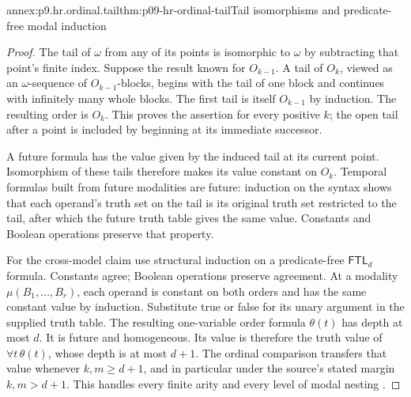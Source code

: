 \begin{annexitem}{annex:p9.hr.ordinal.tail}{thm:p09-hr-ordinal-tail}{Tail isomorphisms and predicate-free modal induction}
\begin{proof}
The tail of \(\omega\) from any of its points is
isomorphic to \(\omega\) by subtracting that
point's finite index. Suppose the result known
for \(O_{k-1}\). A tail of \(O_k\), viewed as
an \(\omega\)-sequence of \(O_{k-1}\)-blocks,
begins with the tail of one block and continues
with infinitely many whole blocks. The first
tail is itself \(O_{k-1}\) by induction.
The resulting order is \(O_k\). This proves
the assertion for every positive \(k\);
the open tail after a point is included
by beginning at its immediate successor.

A future formula has the value given
by the induced tail at its current
point. Isomorphism of these tails
therefore makes its value constant
on \(O_k\). Temporal formulas built
from future modalities are future:
induction on the syntax shows that
each operand's truth set on the
tail is its original truth set
restricted to the tail, after which
the future truth table gives the
same value. Constants and Boolean
operations preserve that property.

For the cross-model claim use
structural induction on a
predicate-free \(\mathsf{FTL}_d\)
formula. Constants agree; Boolean
operations preserve agreement.
At a modality \(\mu(B_1,\ldots,B_r)\),
each operand is constant on both
orders and has the same constant
value by induction. Substitute
true or false for its unary
argument in the supplied truth
table. The resulting one-variable
order formula \(\theta(t)\)
has depth at most \(d\).
It is future and homogeneous.
Its value is therefore the
truth value of \(\forall t\,\theta(t)\),
whose depth is at most \(d+1\).
The ordinal comparison transfers
that value whenever \(k,m\geq d+1\),
and in particular under the
source's stated margin \(k,m>d+1\).
This handles every finite arity
and every level of modal nesting
\cite[Lemmas~3.1--3.4]{HirshfeldRabinovich2003Future}.
\end{proof}
\end{annexitem}

